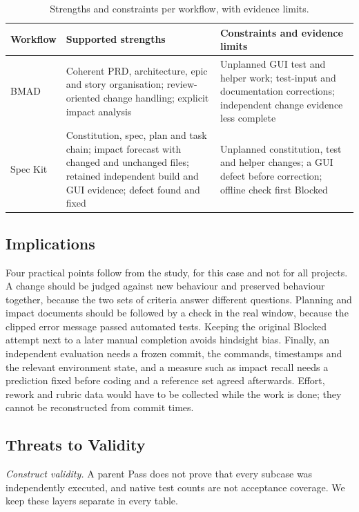 \documentclass[conference]{IEEEtran}
\begin{document}
\begin{table}[htbp]
\caption{Strengths and constraints per workflow, with evidence limits.}\label{tbl-strength}
\centering\footnotesize
\begin{tabular}{p{} p{} p{}}
\hline
\textbf{Workflow} & \textbf{Supported strengths} & \textbf{Constraints and evidence limits} \\
\hline
BMAD & Coherent PRD, architecture, epic and story organisation; review-oriented change handling; explicit impact analysis & Unplanned GUI test and helper work; test-input and documentation corrections; independent change evidence less complete \\
Spec Kit & Constitution, spec, plan and task chain; impact forecast with changed and unchanged files; retained independent build and GUI evidence; defect found and fixed & Unplanned constitution, test and helper changes; a GUI defect before correction; offline check first Blocked \\
\hline
\end{tabular}
\end{table}

\subsection{Implications}\label{implications}

Four practical points follow from the study, for this case and not for
all projects. A change should be judged against new behaviour and
preserved behaviour together, because the two sets of criteria answer
different questions. Planning and impact documents should be followed by
a check in the real window, because the clipped error message passed
automated tests. Keeping the original Blocked attempt next to a later
manual completion avoids hindsight bias. Finally, an independent
evaluation needs a frozen commit, the commands, timestamps and the
relevant environment state, and a measure such as impact recall needs a
prediction fixed before coding and a reference set agreed afterwards.
Effort, rework and rubric data would have to be collected while the work
is done; they cannot be reconstructed from commit times.

\subsection{Threats to Validity}\label{threats-to-validity}

\emph{Construct validity.} A parent Pass does not prove that every
subcase was independently executed, and native test counts are not
acceptance coverage. We keep these layers separate in every table.
\end{document}
